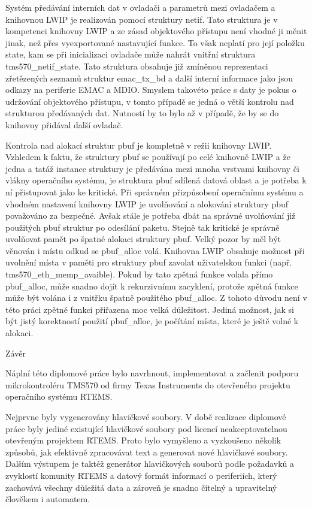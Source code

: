 Systém předávání interních dat v ovladači a parametrů mezi ovladačem a knihovnou LWIP je realizován pomocí struktury netif.
Tato struktura je v kompetenci knihovny LWIP a ze zásad objektového přístupu není vhodné ji měnit jinak, než přes vyexportované nastavující funkce.
To však neplatí pro její položku state, kam se při inicializaci ovladače může nahrát vnitřní struktura tms570\_netif\_state.
Tato struktura obsahuje již zmíněnou reprezentaci zřetězených seznamů struktur emac\_tx\_bd a další interní informace jako jsou odkazy na periferie EMAC a MDIO.
Smyslem takovéto práce s daty je pokus o udržování objektového přístupu, v tomto případě se jedná o větší kontrolu nad strukturou předávaných dat.
Nutností by to bylo až v případě, že by se do knihovny přidával další ovladač.

Kontrola nad alokací struktur pbuf je kompletně v režii knihovny LWIP.
Vzhledem k faktu, že struktury pbuf se používají po celé knihovně LWIP a že jedna a tatáž instance struktury je předávána mezi mnoha vrstvami knihovny či vlákny operačního systému, je struktura pbuf sdílená datová oblast a je potřeba k ní přistupovat jako ke kritické.
Při správném přizpůsobení operačnímu systému a vhodném nastavení knihovny LWIP je uvolňování a alokování struktury pbuf považováno za bezpečné.
Avšak stále je potřeba dbát na správné uvolňování již použitých pbuf struktur po odesílání paketu.
Stejně tak kritické je správně uvolňovat pamět po špatné alokaci struktury pbuf.
Velký pozor by měl být věnován i místu odkud se pbuf\_alloc volá.
Knihovna LWIP obsahuje možnost při uvolnění místa v paměti pro struktury pbuf zavolat uživatelskou funkci (např. tms570\_eth\_memp\_avaible).{}
 Pokud by tato zpětná funkce volala přímo pbuf\_alloc, může snadno dojít k rekurzivnímu zacyklení, protože zpětná funkce může být volána i z vnitřku špatně použitého pbuf\_alloc.
Z tohoto důvodu není v této práci zpětné funkci přiřazena moc velká důležitost.
Jediná možnost, jak si být jistý korektností použití pbuf\_alloc, je počítání místa, které je ještě volné k alokaci.

\chap Závěr

Náplní této diplomové práce bylo navrhnout, implementovat a začlenit podporu mikrokontroléru TMS570 od firmy Texas Instruments do otevřeného projektu operačního systému RTEMS.

\medskip

Nejprvne byly vygenerovány hlavičkové soubory.
V době realizace diplomové práce byly jediné existující hlavičkové soubory pod licencí neakceptovatelnou otevřeným projektem RTEMS.
Proto bylo vymyšleno a vyzkoušeno několik způsobů, jak efektivně zpracovávat text a generovat nové hlavičkové soubory.
Dalším výstupem je taktéž generátor hlavičkových souborů podle požadavků a zvyklostí komunity RTEMS a datový formát informací o periferiích, který zachovává všechny důležitá data a zároveň je snadno čitelný a upravitelný člověkem i automatem.

